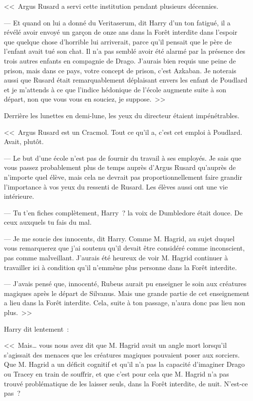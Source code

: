 <<~Argus Rusard a servi cette institution pendant plusieurs décennies.

--- Et quand on lui a donné du Veritaserum, dit Harry d'un ton fatigué, il a révélé avoir envoyé un garçon de onze ans dans la Forêt interdite dans l'espoir que quelque chose d'horrible lui arriverait, parce qu'il pensait que le père de l'enfant avait tué son chat. Il n'a pas semblé avoir été alarmé par la présence des trois autres enfants en compagnie de Drago. J'aurais bien requis une peine de prison, mais dans ce pays, votre concept de prison, c'est Azkaban. Je noterais aussi que Rusard était remarquablement déplaisant envers les enfant de Poudlard et je m'attends à ce que l'indice hédonique de l'école augmente suite à son départ, non que vous vous en souciez, je suppose.~>>

Derrière les lunettes en demi-lune, les yeux du directeur étaient impénétrables.

<<~Argus Rusard est un Cracmol. Tout ce qu'il a, c'est cet emploi à Poudlard. Avait, plutôt.

--- Le but d'une école n'est pas de fournir du travail à ses employés. Je sais que vous passez probablement plus de temps auprès d'Argus Rusard qu'auprès de n'importe quel élève, mais cela ne devrait pas proportionnellement faire grandir l'importance à vos yeux du ressenti de Rusard. Les élèves aussi ont une vie intérieure.

--- Tu t'en fiches complètement, Harry~? la voix de Dumbledore était douce. De ceux auxquels tu fais du mal.

--- Je me soucie des innocents, dit Harry. Comme M. Hagrid, au sujet duquel vous remarquerez que j'ai soutenu qu'il devait être considéré comme inconscient, pas comme malveillant. J'aurais été heureux de voir M. Hagrid continuer à travailler ici à condition qu'il n'emmène plus personne dans la Forêt interdite.

--- J'avais pensé que, innocenté, Rubeus aurait pu enseigner le soin aux créatures magiques après le départ de Silvanus. Mais une grande partie de cet enseignement a lieu dans la Forêt interdite. Cela, suite à ton passage, n'aura donc pas lieu non plus.~>>

Harry dit lentement~:

<<~Mais… vous nous avez dit que M. Hagrid avait un angle mort lorsqu'il s'agissait des menaces que les créatures magiques pouvaient poser aux sorciers. Que M. Hagrid a un déficit cognitif et qu'il n'a pas la capacité d'imaginer Drago ou Tracey en train de souffrir, et que c'est pour cela que M. Hagrid n'a pas trouvé problématique de les laisser seuls, dans la Forêt interdite, de nuit. N'est-ce pas~?

